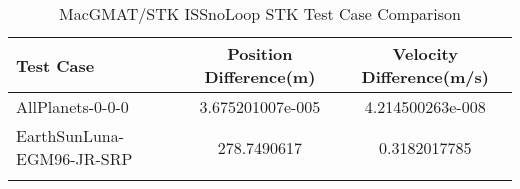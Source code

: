 \begin{table}[htbp!]
\centering
\caption{ MacGMAT/STK ISSnoLoop STK Test Case Comparison}
      \begin{tabular}{lcc}
      \hline\hline
          Test Case & Position Difference(m) & Velocity Difference(m/s) \\
         \hline
         AllPlanets-0-0-0 & 3.675201007e-005 & 4.214500263e-008 \\
         EarthSunLuna-EGM96-JR-SRP & 278.7490617 & 0.3182017785 \\
      \hline\hline
      \label{Table: ISSnoLoop STK Table} 
\end{tabular}
\end{table}
